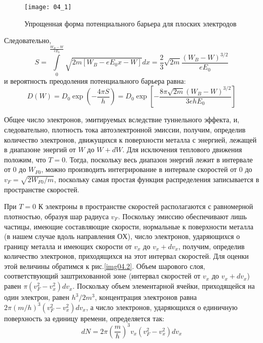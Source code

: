 \begin{figure}[h]
    \center
    \texttt{[image: 04\_1]}
    \caption{Упрощенная форма потенциального барьера для плоских электродов}
    \label{img04.1}
\end{figure}
 
Следовательно,
\[
	S = \int\limits_{0}^{\frac{W_B - W}{eE_0}} \sqrt{2m[W_B-eE_0 x - W]}dx = 
		\frac{2}{3}\sqrt{2m}\frac{(W_B-W)^{3/2}}{eE_0}
\]
и вероятность преодоления потенциального барьера равна:
\begin{equation}
	D(W) = D_0 \exp\left( -\frac{4\pi S}{h} \right) = 
		D_0 \exp\left[ -\frac{8\pi\sqrt{2m}(W_B-W)^{3/2}}{3ehE_0} \right]
	\label{eq04.1.13}
\end{equation}

Общее число электронов, эмитируемых вследствие туннельного эффекта, и, 
следовательно, плотность тока автоэлектронной эмиссии, получим, определив 
количество электронов, движущихся к поверхности металла с энергией, лежащей в 
диапазоне энергий от \( W \) до \( W + dW \). Для исключения теплового 
движения положим, что \( T = 0 \). Тогда, поскольку весь диапазон энергий 
лежит в интервале от \( 0 \) до \( W_{F0} \), можно производить интегрирование 
в интервале скоростей от \( 0 \) до \( v_F = \sqrt{2W_{F0}/m} \), поскольку 
самая простая функция распределения записывается в пространстве скоростей.

При \( T = 0 \) К электроны в пространстве скоростей располагаются с 
равномерной плотностью, образуя шар радиуса \( v_F \). Поскольку эмиссию 
обеспечивают лишь частицы, имеющие составляющие скорости, нормальные к 
поверхности металла (в нашем случае вдоль направления \(ОХ\)), число 
электронов, ударяющихся о границу металла и имеющих скорости от \( v_x \) до 
\( v_x + dv_x \), получим, определив количество электронов, приходящихся на 
этот интервал скоростей. Для оценки этой величины обратимся к 
рис.\ref{img04.2}. Объем шарового слоя, соответствующий заштрихованной зоне 
(интервал скоростей от \( v_x \) до \( v_x + dv_x\)) равен 
\( \pi(v^2_F - v^2_x)dv_x \). Поскольку объем элементарной ячейки, 
приходящейся на один электрон, равен \( h^3 / 2m^3 \), концентрация электронов 
равна \( 2\pi(m/h)^3 (v^2_F - v^2_x)dv_x \), а число электронов, ударяющихся о 
единичную поверхность за единицу времени, определяется так:
\begin{equation}
	dN = 2\pi\left( \frac{m}{h} \right)^3 v_x \left( v^2_F - v^2_x \right)dv_x
	\label{eq04.1.14}
\end{equation}

